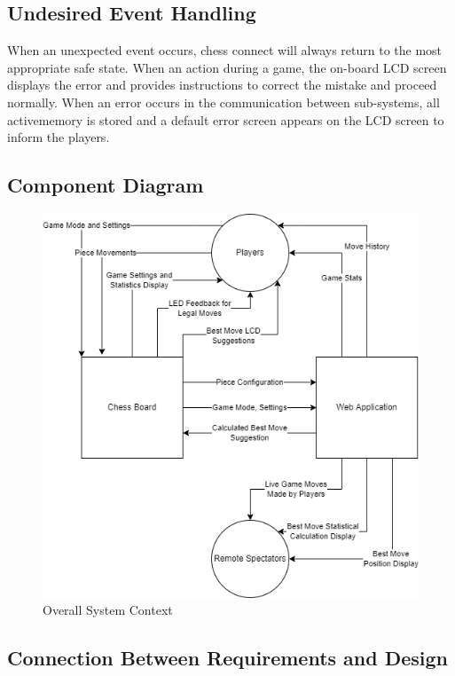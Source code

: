 \documentclass[12pt, titlepage]{article}
\begin{document}
\subsection{Undesired Event Handling}
When an unexpected event occurs, chess connect will always return to the most 
appropriate safe state. When an action during a game, the on-board LCD screen 
displays the error and provides instructions to correct the mistake and proceed 
normally. When an error occurs in the communication between sub-systems, all 
activememory is stored and a default error screen appears on the LCD screen to 
inform the players.

\subsection{Component Diagram}
\begin{figure}[H]
  \begin{center}
    \includegraphics[scale=0.65]{chess-connect-system-context.png}
    \caption{Overall System Context}
    \label{Fig_SystemContext} 
  \end{center}
\end{figure}


\subsection{Connection Between Requirements and Design} \label{SecConnection}
\end{document}
